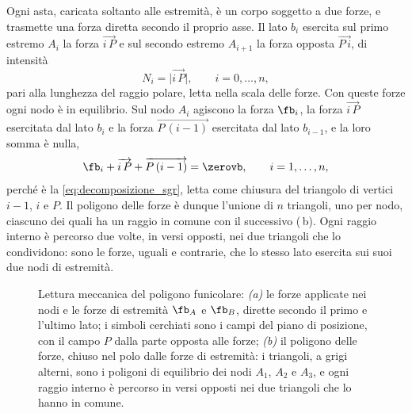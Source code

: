 Ogni asta, caricata soltanto alle estremità, è un corpo soggetto a due forze, e trasmette una
forza diretta secondo il proprio asse. Il lato $b_i$ esercita sul primo estremo $A_i$ la forza
$\overrightarrow{i\,P}$ e sul secondo estremo $A_{i+1}$ la forza opposta $\overrightarrow{P\,i}$,
di intensità
\begin{equation}
	N_i = \bigl|\overrightarrow{i\,P}\bigr| , \qquad i = 0, \dots, n ,
	\label{eq:forza_lato_sgr}
\end{equation}
pari alla lunghezza del raggio polare, letta nella scala delle forze. Con queste forze ogni nodo è
in equilibrio. Sul nodo $A_i$ agiscono la forza $\fb_i$, la forza $\overrightarrow{i\,P}$
esercitata dal lato $b_i$ e la forza $\overrightarrow{P\,(i-1)}$ esercitata dal lato $b_{i-1}$, e
la loro somma è nulla,
\begin{equation}
	\fb_i + \overrightarrow{i\,P} + \overrightarrow{P\,(i-1)} = \zerovb , \qquad i = 1, \dots, n ,
	\label{eq:equilibrio_nodo_sgr}
\end{equation}
perché è la \eqref{eq:decomposizione_sgr}, letta come chiusura del triangolo di vertici $i-1$, $i$
e $P$. Il poligono delle forze è dunque l'unione di $n$ triangoli, uno per nodo, ciascuno dei
quali ha un raggio in comune con il successivo (\,b). Ogni raggio interno è
percorso due volte, in versi opposti, nei due triangoli che lo condividono: sono le forze, uguali
e contrarie, che lo stesso lato esercita sui suoi due nodi di estremità.

\begin{figure}[htbp]
	\centering
	\caption{Lettura meccanica del poligono funicolare: \emph{(a)} le forze applicate nei nodi e le
		forze di estremità $\fb_A$ e $\fb_B$, dirette secondo il primo e l'ultimo lato; i simboli
		cerchiati sono i campi del piano di posizione, con il campo $P$ dalla parte opposta alle forze;
		\emph{(b)} il poligono delle forze, chiuso nel polo dalle forze di estremità: i triangoli, a
		grigi alterni, sono i poligoni di equilibrio dei nodi $A_1$, $A_2$ e $A_3$, e ogni raggio
		interno è percorso in versi opposti nei due triangoli che lo hanno in comune.}
	\label{fig:nodi_sgr}
\end{figure}

